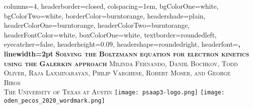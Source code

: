 \documentclass[landscape,archE,fontscale=0.285]{baposter} %
\begin{document}
\begin{poster}
{
columns=4, %
headerborder=closed, %
colspacing=1em, %
bgColorOne=white, %
bgColorTwo=white, %
borderColor=burntorange, %
headershade=plain,
headerColorOne=burntorange, %
headerColorTwo=burntorange, %
headerFontColor=white, %
boxColorOne=white, %
textborder=roundedleft, %
eyecatcher=false, %
headerheight=0.09\textheight, %
headershape=roundedright, %
headerfont=\Large\bf\textsc, %
linewidth=2pt %
}
%
{}
{\bf\textsc{Solving the Boltzmann equation for electron kinetics using the Galerkin approach}\vspace{0.01em}} %
{\textsc{\small Milinda Fernando, Daniil Bochkov, Todd Oliver, Raja Laxminarayan, Philip Varghese, Robert Moser, and George Biros \hspace{12pt} \\The University of Texas at Austin}} %
{%
%
\hspace{12pt} \texttt{[image: psaap3-logo.png]}%
\hspace{12pt} \texttt{[image: oden\_pecos\_2020\_wordmark.png]}%
}


\end{poster}
\end{document}
